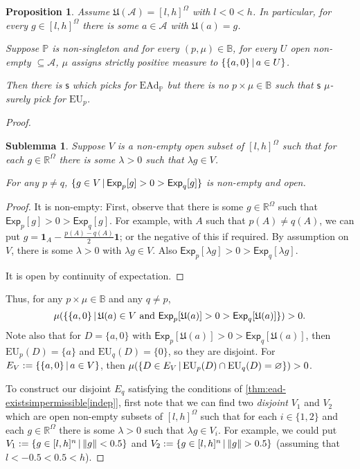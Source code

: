 \documentclass[a4paper]{article}
\newtheorem{proposition}[theorem]{Proposition}
\newtheorem{sublemma}{Sublemma}[theorem]
\newcommand\A{\mathcal{A}}
\renewcommand\P{\mathbb{P}} %
\newcommand\Exp{\mathsf{Exp}}
\newcommand\EU{\mathrm{EU}}
\newcommand\EAd{\mathrm{EAd}}
\newcommand\U{\mathfrak{U}} %
\newcommand\s{\mathsf{s}}
\newcommand{\IB}{\mathbb{B}}
\newcommand{\IP}{\P}
\renewcommand{\Re}{\mathbb{R}}
\renewcommand{\color}[1]{}
\newenvironment{colored}[1]{\leavevmode\color{#1}}{}
\newcommand\SetDelimiter[1][]{
	\nonscript\,#1\vert \allowbreak \nonscript\,\mathopen{}}
\providecommand\given{\SetDelimiter}
\renewcommand{\emptyset}{\varnothing}
\newenvironment{CCM rewritten}
{\begingroup\color{blue}} %
{\endgroup}              %
\begin{document}
\begin{colored}{violet}
\begin{proposition}
	Assume $\U(\A)=[l,h]^\Omega$ with $l<0<h$. In particular, for every $g\in [l,h]^\Omega$ there is some $a\in \A$ with $\U(a)=g$. 


	Suppose $\IP$ is non-singleton and for every $(p,\mu)\in\IB$, for every $U$ open non-empty $\subseteq\A$, $\mu$ assigns strictly positive measure to $\{\{a,0\}\given a\in U\}$.

Then there is $\s$ which picks for $\EAd_\IP$ but there is no $p\times\mu\in \IB$ such that $\s$ $\mu$-surely pick for $\EU_p$.
\end{proposition}
\begin{proof}





\begin{sublemma}
	Suppose $V$ is a non-empty open subset of $[l,h]^\Omega$ such that for each $g\in \Re^\Omega$ there is some $\lambda>0$ such that $\lambda g\in V$. 
	
	For any $p\neq q$, $\{g\in V\given \Exp_p[g]>0>\Exp_q[g]\}$ is non-empty and open.
\end{sublemma}
\begin{proof}
	{It is non-empty}:
	First, observe that there is some $g\in\Re^\Omega$ such that $\Exp_p[g]>0>\Exp_q[g]$. For example, with $A$ such that $p(A)\neq q(A)$, we can put $g=\mathbf{1}_A-\frac{p(A)-q(A)}{2}\mathbf{1}$; or the negative of this if required. 
	By assumption on $V$, there is some $\lambda >0$ with $\lambda g\in V$. Also $\Exp_p[\lambda g]>0>\Exp_{q}[\lambda g]$. 
	
	It is open by continuity of expectation. 
\end{proof}

Thus, for any $p\times\mu\in\IB$ and any $q\neq p$, $$\mu(\{\{a,0\}\given \U(a)\in V\text{ and }\Exp_p[\U(a)]>0>\Exp_q[\U(a)] \})>0.$$ Note also that for $D=\{a,0\}$ with $\Exp_p[\U(a)]>0>\Exp_q[\U(a)]$, then $\EU_{p}(D)=\{a\}$ and $\EU_q(D)=\{0\}$, so they are disjoint. 
For $E_V:=\{\{a,0\}\given a\in V\}$, then $\mu(\{D\in E_V\given \EU_p(D)\cap\EU_q(D)=\emptyset\})>0$. 

To construct our disjoint $E_q$ satisfying the conditions of \cref{thm:ead-existsimpermissible[indep]}, first note that we can find two \emph{disjoint} $V_1$ and $V_2$ which are open non-empty subsets of $[l,h]^\Omega$ such that for each $i\in\{1,2\}$ and each $g\in \Re^\Omega$ there is some $\lambda>0$ such that $\lambda g\in V_i$.
For example, we could put  $V_1:=\{g\in[l,h]^n\given \|g\|<0.5\}$ and $V_2:=\{g\in[l,h]^n\given \|g\|>0.5\}$ (assuming that $l<-0.5<0.5<h$). 



\end{proof}
\end{colored}
\end{document}
